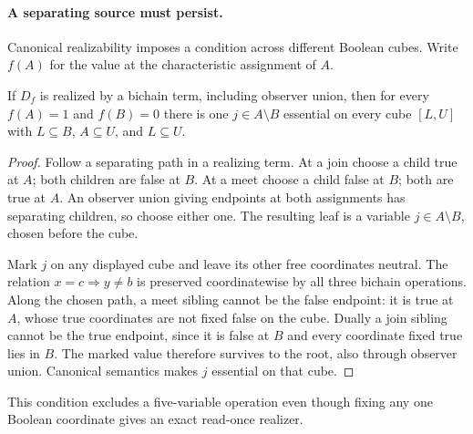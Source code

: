 \paragraph{A separating source must persist.}
Canonical realizability imposes a condition across different Boolean cubes.
Write $f(A)$ for the value at the characteristic assignment of $A$.

\begin{proposition}
\label{core:prop:canonical-separating-source}
If $D_f$ is realized by a bichain term, including observer union, then
for every $f(A)=1$ and $f(B)=0$ there is one $j\in A\setminus B$
essential on every cube $[L,U]$ with $L\subseteq B$, $A\subseteq U$,
and $L\subseteq U$.
\end{proposition}
\begin{proof}
Follow a separating path in a realizing term. At a join choose a child
true at $A$; both children are false at $B$. At a meet choose a child
false at $B$; both are true at $A$. An observer union giving endpoints
at both assignments has separating children, so choose either one.
The resulting leaf is a variable $j\in A\setminus B$, chosen before
the cube.

Mark $j$ on any displayed cube and leave its other free coordinates
neutral. The relation $x=c\Rightarrow y\ne b$ is preserved
coordinatewise by all three bichain operations. Along the chosen path, a meet sibling cannot be the false
endpoint: it is true at $A$, whose true coordinates are not fixed false
on the cube. Dually a join sibling cannot be the true endpoint, since
it is false at $B$ and every coordinate fixed true lies in $B$.
The marked value therefore survives to the root, also through observer
union. Canonical semantics makes $j$ essential on that cube.
\end{proof}

This condition excludes a five-variable operation even though fixing
any one Boolean coordinate gives an exact read-once realizer.

